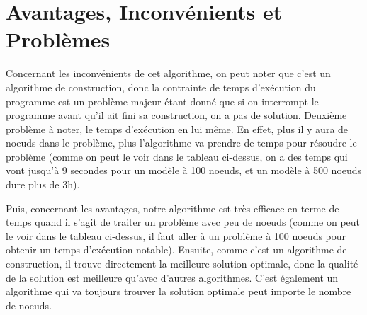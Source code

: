\documentclass[a4paper,10pt]{article}
\begin{document}
\section{Avantages, Inconvénients et Problèmes}

\hspace{1cm}Concernant les inconvénients de cet algorithme, on peut noter que c'est un
algorithme de construction, donc la contrainte de temps d'exécution du 
programme est un problème majeur étant donné que si on interrompt le programme avant qu'il
ait fini sa construction, on a pas de solution. Deuxième problème à noter, 
le temps d'exécution en lui même. En effet, plus il y aura de noeuds dans le problème, plus 
l'algorithme va prendre de temps pour résoudre le problème (comme on peut le voir dans le tableau
ci-dessus, on a des temps qui vont jusqu'à 9 secondes pour un modèle à 100 noeuds, et un modèle à 500 noeuds dure plus de 3h). 

\hspace{0.5cm}Puis, concernant les avantages, notre algorithme est très efficace en terme de
temps quand il s'agit de traiter un problème avec peu de noeuds (comme on peut le voir dans 
le tableau ci-dessus, il faut aller à un problème à 100 noeuds pour obtenir un temps d'exécution 
notable). Ensuite, comme c'est un algorithme de construction, il trouve directement
la meilleure solution optimale, donc la qualité de la solution est meilleure qu'avec d'autres
algorithmes. C'est également un algorithme qui va toujours trouver la solution optimale peut importe le 
nombre de noeuds.\newline
\end{document}
